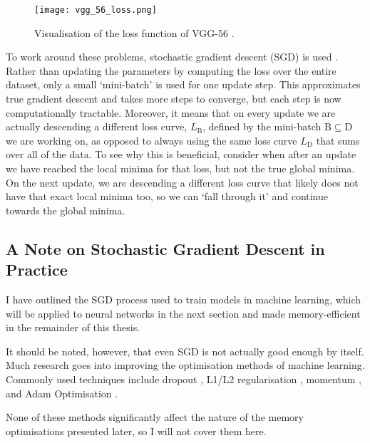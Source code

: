 \begin{figure}[htb]
    \centering
    \texttt{[image: vgg\_56\_loss.png]}
    \caption{Visualisation of the loss function of VGG-56 \cite{Li2018}.}
    \label{fig:2-vgg-loss}
\end{figure}

To work around these problems, stochastic gradient descent (SGD) is used \cite{Bottou2018}. Rather than updating the parameters by computing the loss over the entire dataset, only a small `mini-batch' is used for one update step. This approximates true gradient descent and takes more steps to converge, but each step is now computationally tractable. Moreover, it means that on every update we are actually descending a different loss curve, \(L_\mathrm{B}\), defined by the mini-batch \(\mathrm{B}\subseteq \mathrm{D}\) we are working on, as opposed to always using the same loss curve \(L_\mathrm{D}\) that sums over all of the data. To see why this is beneficial, consider when after an update we have reached the local minima for that loss, but not the true global minima. On the next update, we are descending a different loss curve that likely does not have that exact local minima too, so we can ‘fall through it’ and continue towards the global minima.

\subsection*{A Note on Stochastic Gradient Descent in Practice}
I have outlined the SGD process used to train models in machine learning, which will be applied to neural networks in the next section and made memory-efficient in the remainder of this thesis.

It should be noted, however, that even SGD is not actually good enough by itself.
Much research goes into improving the optimisation methods of machine learning.
Commonly used techniques include dropout \cite{Srivastava2014}, L1/L2 regularisation \cite{Anders1992-weight-decay, Ng2004}, momentum \cite{Sutskever2013}, and Adam Optimisation \cite{Kingma2015-adam}.

None of these methods significantly affect the nature of the memory optimisations presented later, so I will not cover them here.

